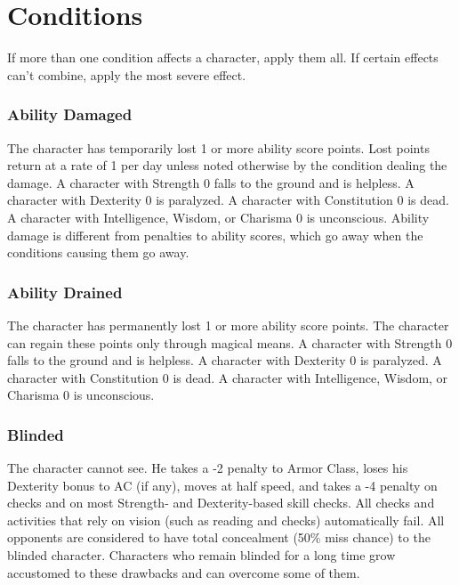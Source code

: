 \section{Conditions}

If more than one condition affects a character, apply them all. If certain effects 
can't combine, apply the most severe effect.

\subsubsection{Ability Damaged}

The character has temporarily lost 1 or more ability 
score points. Lost points return at a rate of 1 per day unless noted otherwise 
by the condition dealing the damage. A character with Strength 0 falls to the ground 
and is helpless. A character with Dexterity 0 is paralyzed. A character with Constitution 
0 is dead. A character with Intelligence, Wisdom, or Charisma 0 is unconscious. 
Ability damage is different from penalties to ability scores, which go away when 
the conditions causing them go away.

\subsubsection{Ability Drained}

The character has permanently lost 1 or more ability 
score points. The character can regain these points only through magical means. 
A character with Strength 0 falls to the ground and is helpless. A character with 
Dexterity 0 is paralyzed. A character with Constitution 0 is dead. A character 
with Intelligence, Wisdom, or Charisma 0 is unconscious. 

\subsubsection{Blinded}

The character cannot see. He takes a -2 penalty to Armor Class, 
loses his Dexterity bonus to AC (if any), moves at half speed, and takes a -4 penalty 
on  checks and on most Strength- and Dexterity-based skill checks. All checks 
and activities that rely on vision (such as reading and  checks) automatically 
fail. All opponents are considered to have total concealment (50\% miss chance) 
to the blinded character. Characters who remain blinded for a long time grow accustomed 
to these drawbacks and can overcome some of them.

